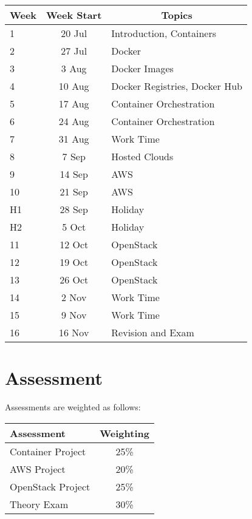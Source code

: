 \documentclass{article}
\begin{document}
\renewcommand{\arraystretch}{1.5}
\begin{tabular}{|l|c|l|}
\hline
 Week & Week Start & \multicolumn{1}{c|}{Topics}             \\ \hline
 1    & 20 Jul     & Introduction, Containers                 \\ \hline
 2    & 27 Jul     & Docker                                   \\ \hline
 3    &  3 Aug     & Docker Images                            \\ \hline
 4    & 10 Aug     & Docker Registries, Docker Hub            \\ \hline
 5    & 17 Aug     & Container Orchestration                  \\ \hline
 6    & 24 Aug     & Container Orchestration                 \\ \hline
 7    & 31 Aug     & Work Time                               \\ \hline
 8    &  7 Sep     & Hosted Clouds                            \\ \hline
 9    & 14 Sep     & AWS                                      \\ \hline
 10   & 21 Sep     & AWS                                      \\ \hline
 H1   & 28 Sep     & Holiday                                  \\ \hline
 H2   &  5 Oct     & Holiday                                  \\ \hline
 11   & 12 Oct     & OpenStack                                \\ \hline
 12   & 19 Oct     & OpenStack                                \\ \hline
 13   & 26 Oct     & OpenStack                               \\ \hline
 14   &  2 Nov     & Work Time                               \\ \hline
 15   &  9 Nov     & Work Time                               \\ \hline
 16   & 16 Nov     & Revision and Exam                       \\ \hline
\end{tabular}

\section*{Assessment}

Assessments are weighted as follows: \\
\begin{tabular}{|l|c|}
\hline
Assessment                  &  Weighting \\ \hline
Container Project           &  25\% \\ \hline
AWS Project                 &  20\% \\ \hline
OpenStack Project           &  25\% \\ \hline
Theory Exam                 &  30\% \\ \hline
\end{tabular}
\end{document}
